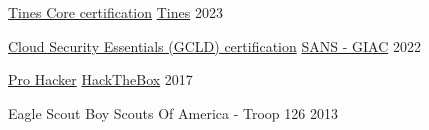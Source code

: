 
\begin{cvhonors}

  \cvhonor
    {\href{https://certification.tines.com/certificate/3FebGM9pnA}{Tines Core certification}}
    {\href{https://www.tines.com/}{Tines}}
    {}
    {2023}

  \cvhonor
    {\href{https://www.credly.com/badges/844480fc-0193-421c-8813-731f345666d6/}{Cloud Security Essentials (GCLD) certification}}
    {\href{https://www.giac.org/}{SANS - GIAC}}
    {}
    {2022}

  \cvhonor
    {\href{https://app.hackthebox.com/profile/3716}{Pro Hacker}} %
    {\href{https://www.hackthebox.com/}{HackTheBox}} %
    {} %
    {2017} %

  \cvhonor
    {Eagle Scout} %
    {Boy Scouts Of America - Troop 126} %
    {} %
    {2013} %

\end{cvhonors}